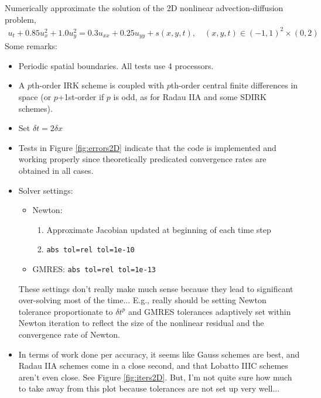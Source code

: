 \documentclass[review]{siamart}
\begin{document}
Numerically approximate the solution of the 2D nonlinear advection-diffusion problem,
\begin{align}
u_t + 0.85 u^2_x + 1.0 u^2_y = 0.3 u_{xx} + 0.25 u_{yy}  + s(x,y,t),
\quad (x,y,t) \in  (-1,1)^2 \times (0, 2)
\end{align}
Some remarks:
\begin{itemize}
\setlength\itemsep{0.5em}
\item Periodic spatial boundaries. All tests use 4 processors.

\item A $p$th-order IRK scheme is coupled with $p$th-order central finite differences in space (or $p$+1st-order if $p$ is odd, as for Radau IIA and some SDIRK schemes).

\item Set $\delta t = 2 \delta x$

\item Tests in Figure \ref{fig:errors2D} indicate that the code is implemented and working properly since theoretically predicated convergence rates are obtained in all cases.

\item Solver settings:
\begin{itemize}
\setlength\itemsep{0.5em}
\item Newton: 
\begin{enumerate}
\item Approximate Jacobian updated at beginning of each time step
\item  \texttt{abs tol=rel tol=1e-10}
\end{enumerate}

\item GMRES: \texttt{abs tol=rel tol=1e-13}
\end{itemize}

These settings don't really make much sense because they lead to significant over-solving most of the time... E.g., really should be setting Newton tolerance proportionate to $\delta t^p$ and GMRES tolerances adaptively set within Newton iteration to reflect the size of the nonlinear residual and the convergence rate of Newton.

\item In terms of work done per accuracy, it seems like Gauss schemes are best, and Radau IIA schemes come in a close second, and that Lobatto IIIC schemes aren't even close. See Figure \ref{fig:iters2D}. But, I'm not quite sure how much to take away from this plot because tolerances are not set up very well...


\end{itemize}
\end{document}
